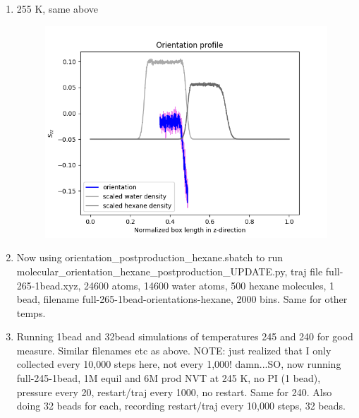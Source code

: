 \documentclass[12pt,reqno]{amsart}
\numberwithin{equation}{section}
\begin{document}
\begin{enumerate}
\item 255 K, same above 

\begin{figure}[H]
\centering
\includegraphics[scale=0.6]{full-255-1bead-orientations-water}
\end{figure}

\item Now using orientation\_postproduction\_hexane.sbatch to run molecular\_orientation\_hexane\_postproduction\_UPDATE.py, traj file full-265-1bead.xyz, 24600 atoms, 14600 water atoms, 500 hexane molecules, 1 bead, filename full-265-1bead-orientations-hexane, 2000 bins. Same for other temps.  

\item Running 1bead and 32bead simulations of temperatures 245 and 240 for good measure.  Similar filenames etc as above.  NOTE: just realized that I only collected every 10,000 steps here, not every 1,000! damn...SO, now running full-245-1bead, 1M equil and 6M prod NVT at 245 K, no PI (1 bead), pressure every 20, restart/traj every 1000, no restart.  Same for 240.  Also doing 32 beads for each, recording restart/traj every 10,000 steps, 32 beads.  

\end{enumerate}
\end{document}

